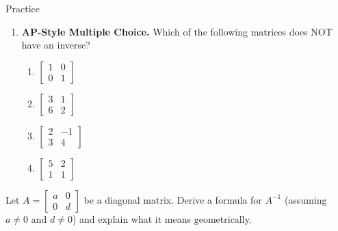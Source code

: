 \documentclass[10pt]{article}
\begin{document}
\begin{notesbox}{Practice}
\begin{enumerate}[leftmargin=1.5em, itemsep=6pt]
    \item \textbf{AP-Style Multiple Choice.} Which of the following matrices does NOT have an
          inverse?
    \begin{enumerate}[label=(\Alph*), leftmargin=2em, itemsep=4pt]
        \item $\begin{bmatrix}1&0\\0&1\end{bmatrix}$
        \item $\begin{bmatrix}3&1\\6&2\end{bmatrix}$
        \item $\begin{bmatrix}2&-1\\3&4\end{bmatrix}$
        \item $\begin{bmatrix}5&2\\1&1\end{bmatrix}$
    \end{enumerate}

\end{enumerate}
\end{notesbox}

\vspace{0.1in}

\begin{extensionbox}
    Let $A = \begin{bmatrix}a&0\\0&d\end{bmatrix}$ be a diagonal matrix. Derive a formula
    for $A^{-1}$ (assuming $a \ne 0$ and $d \ne 0$) and explain what it means geometrically.
\end{extensionbox}
\end{document}
